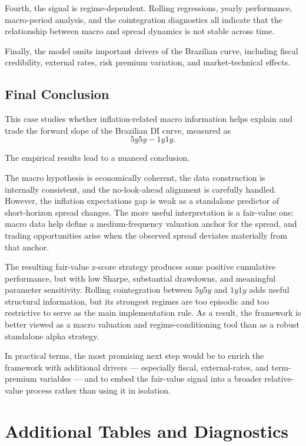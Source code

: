 \documentclass[11pt]{article}
\begin{document}
	Fourth, the signal is regime-dependent. Rolling regressions, yearly performance, macro-period analysis, and the cointegration diagnostics all indicate that the relationship between macro and spread dynamics is not stable across time.
	
	Finally, the model omits important drivers of the Brazilian curve, including fiscal credibility, external rates, risk premium variation, and market-technical effects.
	
	\subsection{Final Conclusion}
	\label{subsec:final_conclusion}
	
	This case studies whether inflation-related macro information helps explain and trade the forward slope of the Brazilian DI curve, measured as
	\[
	5y5y - 1y1y.
	\]
	
	The empirical results lead to a nuanced conclusion.
	
	The macro hypothesis is economically coherent, the data construction is internally consistent, and the no-look-ahead alignment is carefully handled. However, the inflation expectations gap is weak as a standalone predictor of short-horizon spread changes. The more useful interpretation is a fair-value one: macro data help define a medium-frequency valuation anchor for the spread, and trading opportunities arise when the observed spread deviates materially from that anchor.
	
	The resulting fair-value z-score strategy produces some positive cumulative performance, but with low Sharpe, substantial drawdowns, and meaningful parameter sensitivity. Rolling cointegration between \(5y5y\) and \(1y1y\) adds useful structural information, but its strongest regimes are too episodic and too restrictive to serve as the main implementation rule. As a result, the framework is better viewed as a macro valuation and regime-conditioning tool than as a robust standalone alpha strategy.
	
	In practical terms, the most promising next step would be to enrich the framework with additional drivers --- especially fiscal, external-rates, and term-premium variables --- and to embed the fair-value signal into a broader relative-value process rather than using it in isolation.
	
	\appendix
	
	\section{Additional Tables and Diagnostics}
	
\end{document}
